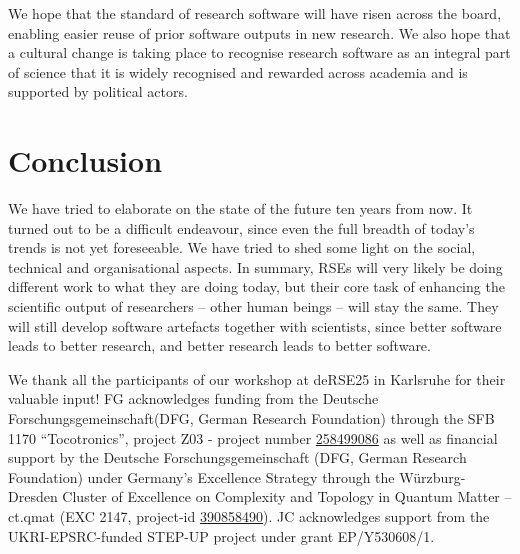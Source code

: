 \documentclass{eceasst}
\newcommand{\geprislink}[1]{\href{https://gepris.dfg.de/gepris/projekt/#1?language=en}{#1}}
\begin{document}
We hope that the standard of research software will have risen across the board,
enabling easier reuse of prior software outputs in new research.
We also hope that a cultural change is taking place to recognise research software
as an integral part of science that it is widely recognised and rewarded across
academia and is supported by political actors.

\section{Conclusion}
We have tried to elaborate on the state of the future ten years from now.
It turned out to be a difficult endeavour, since even the full breadth of today's trends is not yet foreseeable.
We have tried to shed some light on the social, technical and organisational aspects.
In summary, RSEs will very likely be doing different work to what they are doing today,
but their core task of enhancing the scientific output of researchers -- other human
beings -- will stay the same.
They will still develop software artefacts together with scientists,
since better software leads to better research,
and better research leads to better software.

\begin{acknowledge}
We thank all the participants of our workshop at deRSE25 in Karlsruhe for their valuable input!
FG acknowledges funding from the Deutsche Forschungsgemeinschaft(DFG, German Research Foundation) through the SFB 1170 “Tocotronics”, project Z03 - project number \geprislink{258499086}
as well as financial support by the Deutsche Forschungsgemeinschaft (DFG, German Research
Foundation) under Germany’s Excellence Strategy through the Würzburg-Dresden Cluster of Excellence on Complexity and Topology in Quantum Matter – ct.qmat (EXC 2147, project-id \geprislink{390858490}).
JC acknowledges support from the UKRI-EPSRC-funded STEP-UP project under grant EP/Y530608/1.
\end{acknowledge}



\end{document}
